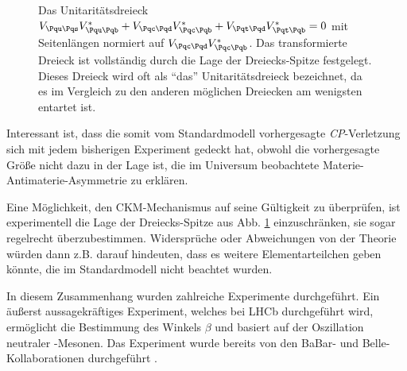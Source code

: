 \begin{figure}
  \centering
  \caption{Das Unitaritätsdreieck $\Vud\Vub^* + \Vcd\Vcb^* + \Vtd\Vtb^* = 0$ mit Seitenlängen normiert auf $\Vcd\Vcb^*$.
  Das transformierte Dreieck ist vollständig durch die Lage der Dreiecks-Spitze festgelegt.
  Dieses Dreieck wird oft als \enquote{das} Unitaritätsdreieck bezeichnet, da es im Vergleich zu den anderen möglichen Dreiecken am wenigsten entartet ist.}
  \label{unitarity-triangle}
\end{figure}

Interessant ist, dass die somit vom Standardmodell vorhergesagte \textit{CP}-Verletzung sich mit jedem bisherigen Experiment gedeckt hat, obwohl die vorhergesagte Größe nicht dazu in der Lage ist, die im Universum beobachtete Ma\-te\-rie-Anti\-materie-Asymmetrie zu erklären.

Eine Möglichkeit, den CKM-Mechanismus auf seine Gültigkeit zu überprüfen, ist experimentell die Lage der Dreiecks-Spitze aus Abb. \ref{unitarity-triangle} einzuschränken, sie sogar regelrecht überzubestimmen.
Widersprüche oder Abweichungen von der Theorie würden dann z.B. darauf hindeuten, dass es weitere Elementarteilchen geben könnte, die im Standardmodell nicht beachtet wurden.

In diesem Zusammenhang wurden zahlreiche Experimente durchgeführt.
Ein äußerst aussagekräftiges Experiment, welches bei LHCb durchgeführt wird, ermöglicht die Bestimmung des Winkels $β$ und basiert auf der Oszillation neutraler \PB-Mesonen. Das Experiment wurde bereits von den BaBar- und Belle-Kollaborationen durchgeführt \cite{babar-sin2beta}\cite{belle-sin2beta}.


